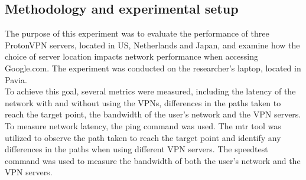 \documentclass[eng]{class}
\begin{document}
\subsection{Methodology and experimental setup}
The purpose of this experiment was to evaluate the performance of three ProtonVPN servers, located in US, Netherlands and Japan,
and examine how the choice of server location impacts network performance when accessing Google.com. The experiment was conducted on the researcher's laptop, located in Pavia.\\
To achieve this goal, several metrics were measured, including the latency of the network with and without using the VPNs,
differences in the paths taken to reach the target point, the bandwidth of the user's network and the VPN servers.\\
To measure network latency, the ping command was used.
The mtr tool was utilized to observe the path taken to reach the target point and identify any differences in the paths when using different VPN servers.
The speedtest command was used to measure the bandwidth of both the user's network and the VPN servers.
\end{document}
